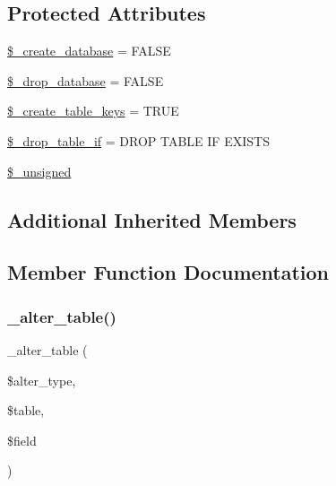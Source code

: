 \subsection*{Protected Attributes}
\begin{DoxyCompactItemize}
\item 
\mbox{\hyperlink{class_c_i___d_b__pdo__cubrid__forge_acd23c9a8735806155f1a5d0a87c151f2}{\$\+\_\+create\+\_\+database}} = F\+A\+L\+SE
\item 
\mbox{\hyperlink{class_c_i___d_b__pdo__cubrid__forge_a8305b12fc17f6f87778260ebdff287b4}{\$\+\_\+drop\+\_\+database}} = F\+A\+L\+SE
\item 
\mbox{\hyperlink{class_c_i___d_b__pdo__cubrid__forge_a73e07acdd35c948ad353903c2827af6e}{\$\+\_\+create\+\_\+table\+\_\+keys}} = T\+R\+UE
\item 
\mbox{\hyperlink{class_c_i___d_b__pdo__cubrid__forge_a92a8a9145a7fc91e252e58d019373581}{\$\+\_\+drop\+\_\+table\+\_\+if}} = \textquotesingle{}D\+R\+OP T\+A\+B\+LE IF E\+X\+I\+S\+TS\textquotesingle{}
\item 
\mbox{\hyperlink{class_c_i___d_b__pdo__cubrid__forge_aae977ae6d61fa183f0b25422b6ddc31c}{\$\+\_\+unsigned}}
\end{DoxyCompactItemize}
\subsection*{Additional Inherited Members}


\subsection{Member Function Documentation}
\mbox{\label{class_c_i___d_b__pdo__cubrid__forge_a41c6cae02f2fda8b429ad0afb9509426}} 
\subsubsection{\texorpdfstring{\+\_\+alter\+\_\+table()}{\_alter\_table()}}
{\footnotesize\ttfamily \+\_\+alter\+\_\+table (\begin{DoxyParamCaption}\item[{}]{\$alter\+\_\+type,  }\item[{}]{\$table,  }\item[{}]{\$field }\end{DoxyParamCaption})\hspace{0.3cm}{\ttfamily [protected]}}

